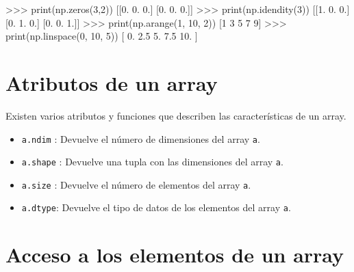 \documentclass[
  spanish,
  a4paper,
]{scrreport}
\newenvironment{Shaded}{\begin{snugshade}}{\end{snugshade}}
\newcommand{\BuiltInTok}[1]{\textcolor[rgb]{0.00,0.23,0.31}{#1}}
\newcommand{\DecValTok}[1]{\textcolor[rgb]{0.68,0.00,0.00}{#1}}
\newcommand{\FloatTok}[1]{\textcolor[rgb]{0.68,0.00,0.00}{#1}}
\newcommand{\NormalTok}[1]{\textcolor[rgb]{0.00,0.23,0.31}{#1}}
\newcommand{\OperatorTok}[1]{\textcolor[rgb]{0.37,0.37,0.37}{#1}}
\begin{document}
\begin{Shaded}
\begin{Highlighting}[]
\OperatorTok{\textgreater{}\textgreater{}\textgreater{}} \BuiltInTok{print}\NormalTok{(np.zeros(}\DecValTok{3}\NormalTok{,}\DecValTok{2}\NormalTok{))}
\NormalTok{[[}\FloatTok{0.} \FloatTok{0.} \FloatTok{0.}\NormalTok{]}
\NormalTok{ [}\FloatTok{0.} \FloatTok{0.} \FloatTok{0.}\NormalTok{]]}
\OperatorTok{\textgreater{}\textgreater{}\textgreater{}} \BuiltInTok{print}\NormalTok{(np.idendity(}\DecValTok{3}\NormalTok{))}
\NormalTok{[[}\FloatTok{1.} \FloatTok{0.} \FloatTok{0.}\NormalTok{]}
\NormalTok{ [}\FloatTok{0.} \FloatTok{1.} \FloatTok{0.}\NormalTok{]}
\NormalTok{ [}\FloatTok{0.} \FloatTok{0.} \FloatTok{1.}\NormalTok{]]}
\OperatorTok{\textgreater{}\textgreater{}\textgreater{}} \BuiltInTok{print}\NormalTok{(np.arange(}\DecValTok{1}\NormalTok{, }\DecValTok{10}\NormalTok{, }\DecValTok{2}\NormalTok{))}
\NormalTok{[}\DecValTok{1} \DecValTok{3} \DecValTok{5} \DecValTok{7} \DecValTok{9}\NormalTok{]}
\OperatorTok{\textgreater{}\textgreater{}\textgreater{}} \BuiltInTok{print}\NormalTok{(np.linspace(}\DecValTok{0}\NormalTok{, }\DecValTok{10}\NormalTok{, }\DecValTok{5}\NormalTok{))}
\NormalTok{[ }\FloatTok{0.}   \FloatTok{2.5}  \FloatTok{5.}   \FloatTok{7.5} \FloatTok{10.}\NormalTok{ ]}
\end{Highlighting}
\end{Shaded}

\section{Atributos de un array}\label{atributos-de-un-array}

Existen varios atributos y funciones que describen las características
de un array.

\begin{itemize}
\item
  \texttt{a.ndim} : Devuelve el número de dimensiones del array
  \texttt{a}.
\item
  \texttt{a.shape} : Devuelve una tupla con las dimensiones del array
  \texttt{a}.
\item
  \texttt{a.size} : Devuelve el número de elementos del array
  \texttt{a}.
\item
  \texttt{a.dtype}: Devuelve el tipo de datos de los elementos del array
  \texttt{a}.
\end{itemize}

\section{Acceso a los elementos de un
array}\label{acceso-a-los-elementos-de-un-array}
\end{document}
